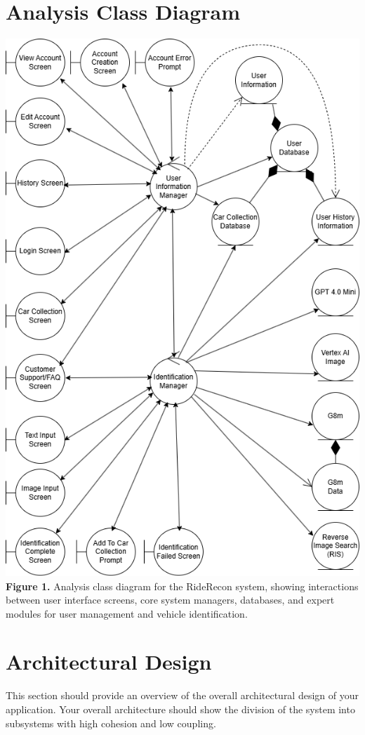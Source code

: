 \documentclass[]{article}
\begin{document}
\section{Analysis Class Diagram}
\label{sec:analysis_class_diagram}
\begin{center}
	\includegraphics[scale=0.5]{images/AnalysisDiagram_compacted.png}\\ 
	\textbf{Figure 1.} Analysis class diagram for the RideRecon system, showing interactions between user interface screens, core system managers, databases, and expert modules for user management and vehicle identification.
\end{center}


\section{Architectural Design}
\label{sec:architectural_design}
This section should provide an overview of the overall architectural design of your application. Your overall architecture should show the division of the system into subsystems with high cohesion and low coupling.
\end{document}
